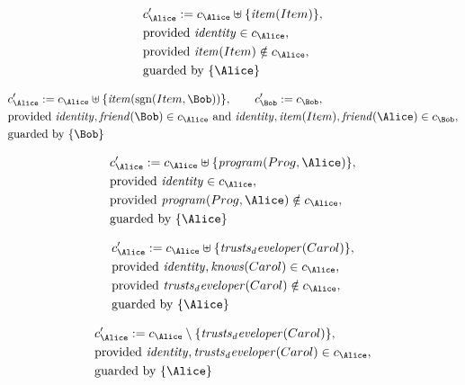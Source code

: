 \begin{align*}
&
c'_
{
\Alice
}
 := 
c_
{
\Alice
}
 \uplus 
\{
\mathit{
item
}
(
Item
)
\}
,\\
&
\text{provided } 
\mathit{
identity
}
 \in c_
{
\Alice
}
,\\
&
\text{provided } 
\mathit{
item
}
(
Item
)
 \notin c_
{
\Alice
}
,\\
&
\text{guarded by } \{
\Alice
\}
\end{align*}

\begin{align*}
&
c'_
{
\Alice
}
 := 
c_
{
\Alice
}
 \uplus 
\{
\mathit{
item
}
(
\mathrm{sgn}(
Item
,
\Bob
)
)
\}
, \qquad 
c'_
{
\Bob
}
 := 
c_
{
\Bob
}
,\\
&
\text{provided } 
\mathit{
identity
}
,
\mathit{
friend
}
(
\Bob
)
 \in c_
{
\Alice
}
 \text{ and } 
\mathit{
identity
}
,
\mathit{
item
}
(
Item
)
,
\mathit{
friend
}
(
\Alice
)
 \in c_
{
\Bob
}
,\\
&
\text{guarded by } \{
\Bob
\}
\end{align*}

\begin{align*}
&
c'_
{
\Alice
}
 := 
c_
{
\Alice
}
 \uplus 
\{
\mathit{
program
}
(
Prog
,
\Alice
)
\}
,\\
&
\text{provided } 
\mathit{
identity
}
 \in c_
{
\Alice
}
,\\
&
\text{provided } 
\mathit{
program
}
(
Prog
,
\Alice
)
 \notin c_
{
\Alice
}
,\\
&
\text{guarded by } \{
\Alice
\}
\end{align*}

\begin{align*}
&
c'_
{
\Alice
}
 := 
c_
{
\Alice
}
 \uplus 
\{
\mathit{
trusts_developer
}
(
Carol
)
\}
,\\
&
\text{provided } 
\mathit{
identity
}
,
\mathit{
knows
}
(
Carol
)
 \in c_
{
\Alice
}
,\\
&
\text{provided } 
\mathit{
trusts_developer
}
(
Carol
)
 \notin c_
{
\Alice
}
,\\
&
\text{guarded by } \{
\Alice
\}
\end{align*}

\begin{align*}
&
c'_
{
\Alice
}
 := 
c_
{
\Alice
}
 \setminus 
\{
\mathit{
trusts_developer
}
(
Carol
)
\}
,\\
&
\text{provided } 
\mathit{
identity
}
,
\mathit{
trusts_developer
}
(
Carol
)
 \in c_
{
\Alice
}
,\\
&
\text{guarded by } \{
\Alice
\}
\end{align*}
\iffalse
